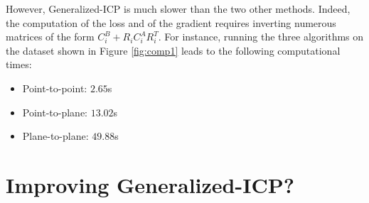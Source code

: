 \documentclass[11pt,letterpaper,leqno]{article}
\begin{document}
However, Generalized-ICP is much slower than the two other methods. Indeed, the computation of the loss and of the gradient requires inverting numerous matrices of the form $C_i^B + R_i C_i^A R_i^T$. For instance, running the three algorithms on the dataset shown in Figure \ref{fig:comp1} leads to the following computational times:
\begin{itemize}
    \item Point-to-point: $2.65$s
    \item Point-to-plane: $13.02$s
    \item Plane-to-plane: $49.88$s
\end{itemize}

\section{Improving Generalized-ICP?}
\end{document}
